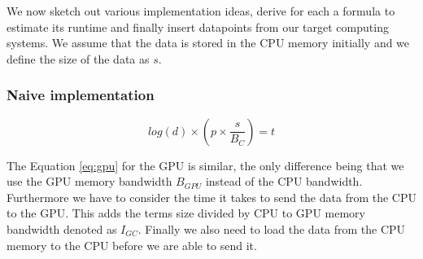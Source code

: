 \documentclass[]{article}
\begin{document}
\begin{figure}[H]
\begin{center}
	\end{center}
\end{figure}

We now sketch out various implementation ideas, derive for each a formula to estimate its runtime and finally insert datapoints from our target computing systems.
We assume that the data is stored in the CPU memory initially and we define the size of the data as $s$. 


\subsubsection{Naive implementation}

\begin{center}
	\begin{equation}
			log(d) \times \left ( p \times \frac{ s }{B_{C}} \right ) = t
	\end{equation}
\end{center}

\vspace{5mm}


The Equation \ref{eq:gpu} for the GPU is similar, the only difference being that we use the GPU memory bandwidth $B_{GPU}$ instead of the CPU bandwidth. Furthermore we have to consider the time it takes to send the data from the CPU to the GPU. This adds the terms size divided by CPU to GPU memory bandwidth denoted as $I_{GC}$. Finally we also need to load the data from the CPU memory to the CPU before we are able to send it. 
\end{document}

